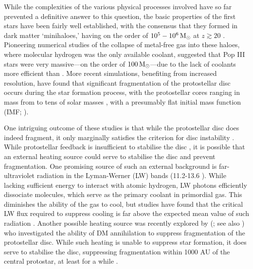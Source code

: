 \documentclass[../thesis.tex]{subfiles}
\begin{document}
While the complexities of the various physical processes involved have so far prevented a definitive answer to this question, the basic properties of the first stars have been fairly well established, with the consensus that they formed in dark matter `minihaloes,' having on the order of $10^5 - 10^6 \,\mathrm{M}_{\odot}$ at $z\gtrsim 20$ \citep{CouchmanRees1986, HaimanThoulLoeb1996, Tegmarketal1997}.  Pioneering numerical studies of the collapse of metal-free gas into these haloes, where molecular hydrogen was the only available coolant, suggested that Pop III stars were very massive---on the order of $100\,\mathrm{M}_{\odot}$---due to the lack of coolants more efficient than \htwo \citep[e.g.,][]{BrommCoppiLarson1999, BrommCoppiLarson2002, AbelBryanNorman2002, Yoshidaetal2003, BrommLarson2004, Yoshidaetal2006, OSheaNorman2007}.  More recent simulations, benefiting from increased resolution, have found that significant fragmentation of the protostellar disc occurs during the star formation process, with the protostellar cores ranging in mass from  to tens of solar masses \citep{StacyGreifBromm2010, Clarketal2011a, Clarketal2011b, Greifetal2011, Greifetal2012, StacyBromm2013, SusaHasegawaTominaga2014, Hiranoetal2014,Hiranoetal2015}, with a presumably flat initial mass function (IMF; \citealt{Dopckeetal2013}).

One intriguing outcome of these studies is that while the protostellar disc does indeed fragment, it only marginally satisfies the \citet{Gammie2001} criterion for disc instability \citep{Clarketal2011b, Greifetal2011, Greifetal2012}. While protostellar feedback is insufficient to stabilise the disc \citep{Smithetal2011, StacyGreifBromm2012}, it is possible that an external heating source could serve to stabilise the disc and prevent fragmentation. One promising source of such an external background is far-ultraviolet radiation in the Lyman-Werner (LW) bands (11.2-13.6 \ev).  While lacking sufficient energy to interact with atomic hydrogen, LW photons efficiently dissociate \htwo molecules, which serve as the primary coolant in primordial gas.  This diminishes the ability of the gas to cool, but studies have found that the critical LW flux required to suppress \htwo cooling is far above the expected mean value of such radiation \citep{Dijkstraetal2008}. Another possible heating source was recently explored by \citeauthor{Smithetal2012b}  (\citeyear{Smithetal2012b}; see also \citealt{Ripamontietal2009, Ripamontietal2010}) who investigated the ability of DM annihilation  to suppress fragmentation of the protostellar disc.  While such heating is unable to suppress star formation, it does serve to stabilise the disc, suppressing fragmentation within 1000 AU of the central protostar, at least for a while \citep{Stacyetal2012, Stacyetal2014}.
\end{document}
